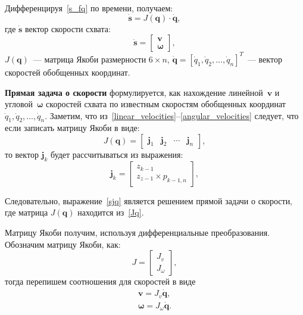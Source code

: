 Дифференцируя~\eqref{s_fq} по времени, получаем:
\begin{equation}\label{sjq}
	\dot{\mathbf{s}} = J (\mathbf{q}) \cdot \dot{\mathbf{q}},
\end{equation}
где $ \dot{\mathbf{s}} $ вектор скорости схвата:
\begin{equation}\label{fvk_1}
	\dot{\mathbf{s}} =
	\begin{bmatrix}
			\bm{v} \\ 
		\bm{\omega}
	\end{bmatrix}\!\!\!,
\end{equation}
$ J(\mathbf{q}) $~--- матрица Якоби размерности $ 6 \times n $, $\dot{\mathbf{q}} = [\dot{q}_1, \dot{q}_2, \dots, \dot{q}_n]^T $~--- вектор скоростей обобщенных координат.

\textbf{Прямая задача о скорости} формулируется, как нахождение линейной~$ \bm{v} $ и угловой~$ \bm{\omega} $ скоростей схвата по известным скоростям обобщенных координат $ \dot{q}_1, \dot{q}_2, \dots, \dot{q}_n $.
Заметим, что из~\eqref{linear_velocities}--\eqref{angular_velocities} следует, что если записать матрицу Якоби в виде:
\begin{equation}\label{Jq}
	J(\mathbf{q}) = 
	\begin{bmatrix}
	\bm{j}_1 & \bm{j}_2 & \cdots & \bm{j}_n
	\end{bmatrix},
\end{equation}
то вектор $ \bm{j}_k $ будет рассчитываться из выражения:
\begin{equation}
	\bm{j}_k = 
	\begin{bmatrix}
	z_{k-1} \\
	z_{z-1} \times p_{k-1,n}
	\end{bmatrix},
\end{equation}

Следовательно, выражение~\eqref{sjq} является решением прямой задачи о скорости, где матрица $ J(\mathbf{q}) $ находится из~\eqref{Jq}.

Матрицу Якоби получим, используя дифференциальные преобразования. Обозначим матрицу Якоби, как:
\begin{equation}\label{J}
	J = 
	\begin{bmatrix}
		J_v \\ 
		J_{\omega}
	\end{bmatrix}\!\!\!,
\end{equation}
тогда перепишем соотношения для скоростей в виде
\begin{align}
	\label{Jv1}
	\bm{v}  = J_{v} \dot{\bm{q}}, \\
	\label{Jw1}
	\bm{\omega} = J_{\omega} \dot{\bm{q}}.
\end{align}

